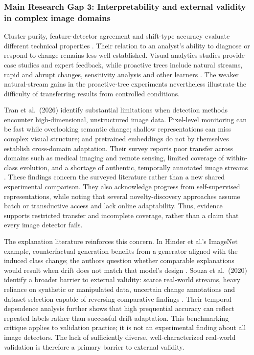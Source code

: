 \documentclass[10pt,a4paper]{article}
\begin{document}
\subsubsection*{Main Research Gap 3: Interpretability and external validity in complex image domains}
Cluster purity, feature-detector agreement and shift-type accuracy evaluate different technical properties \cite{greco,szucs,roschewitz}. Their relation to an analyst's ability to diagnose or respond to change remains less well established. Visual-analytics studies provide case studies and expert feedback, while proactive trees include natural streams, rapid and abrupt changes, sensitivity analysis and other learners \cite{driftvis,conceptexplorer,guerrero}. The weaker natural-stream gains in the proactive-tree experiments nevertheless illustrate the difficulty of transferring results from controlled conditions.

Tran et al.\ (2026) identify substantial limitations when detection methods encounter high-dimensional, unstructured image data. Pixel-level monitoring can be fast while overlooking semantic change; shallow representations can miss complex visual structure; and pretrained embeddings do not by themselves establish cross-domain adaptation. Their survey reports poor transfer across domains such as medical imaging and remote sensing, limited coverage of within-class evolution, and a shortage of authentic, temporally annotated image streams \cite[Secs.~5.2.3,6.1--6.4 and Appendix~A]{tran}. These findings concern the surveyed literature rather than a new shared experimental comparison. They also acknowledge progress from self-supervised representations, while noting that several novelty-discovery approaches assume batch or transductive access and lack online adaptability. Thus, evidence supports restricted transfer and incomplete coverage, rather than a claim that every image detector fails.

The explanation literature reinforces this concern. In Hinder et al.'s ImageNet example, counterfactual generation benefits from a generator aligned with the induced class change; the authors question whether comparable explanations would result when drift does not match that model's design \cite[Sec.~4.2.3]{hinder2023}. Souza et al.\ (2020) identify a broader barrier to external validity: scarce real-world streams, heavy reliance on synthetic or manipulated data, uncertain change annotations and dataset selection capable of reversing comparative findings \cite[Secs.~3--4]{souza2020}. Their temporal-dependence analysis further shows that high prequential accuracy can reflect repeated labels rather than successful drift adaptation. This benchmarking critique applies to validation practice; it is not an experimental finding about all image detectors. The lack of sufficiently diverse, well-characterized real-world validation is therefore a primary barrier to external validity.
\end{document}
